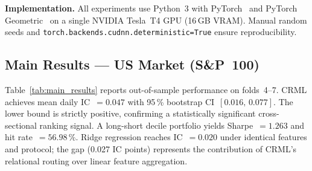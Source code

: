 \documentclass[journal]{IEEEtran}
\begin{document}
\begin{table}[!t]
\renewcommand{\arraystretch}{1.25}
\caption{Post-HPO Hyperparameter Configurations}
\label{tab:hpo}
\centering
{}
\end{table}

\textbf{Implementation.} All experiments use Python~3 with
PyTorch~\cite{paszke2019pytorch} and PyTorch
Geometric~\cite{fey2019fast} on a single NVIDIA Tesla~T4 GPU
(16\,GB VRAM). Manual random seeds and
\texttt{torch.backends.cudnn.deterministic=True} ensure reproducibility.

\subsection{Main Results --- US Market (S\&P~100)}

Table~\ref{tab:main_results} reports out-of-sample performance on
folds~4--7. CRML achieves mean daily IC~$=0.047$ with 95\,\% bootstrap
CI~$[0.016,\,0.077]$. The lower bound is strictly positive, confirming
a statistically significant cross-sectional ranking signal. A long-short
decile portfolio yields Sharpe~$=1.263$ and hit rate~$=56.98\,\%$.
Ridge regression reaches IC~$=0.020$ under identical features and
protocol; the gap (0.027 IC points) represents the contribution of
CRML's relational routing over linear feature aggregation.
\end{document}
